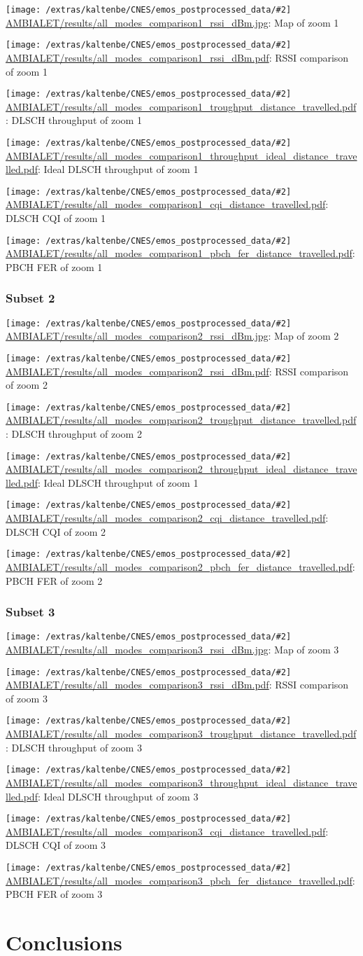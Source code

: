 \documentclass[a4paper,10pt]{article}
\newcommand{\printfile}[2][]{
 \begin{minipage}{8cm}
  \centering
  \texttt{[image: /extras/kaltenbe/CNES/emos\_postprocessed\_data/\#2]}
  \url{#2}: #1

 \end{minipage}
}
\begin{document}
\printfile[Map of zoom 1]{AMBIALET/results/all_modes_comparison1_rssi_dBm.jpg}
\printfile[RSSI comparison of zoom 1]{AMBIALET/results/all_modes_comparison1_rssi_dBm.pdf}

\printfile[DLSCH throughput of zoom 1]{AMBIALET/results/all_modes_comparison1_troughput_distance_travelled.pdf}
\printfile[Ideal DLSCH throughput of zoom 1]{AMBIALET/results/all_modes_comparison1_throughput_ideal_distance_travelled.pdf}

\printfile[DLSCH CQI of zoom 1]{AMBIALET/results/all_modes_comparison1_cqi_distance_travelled.pdf}
\printfile[PBCH FER of zoom 1]{AMBIALET/results/all_modes_comparison1_pbch_fer_distance_travelled.pdf}

\subsubsection*{Subset 2}

\printfile[Map of zoom 2]{AMBIALET/results/all_modes_comparison2_rssi_dBm.jpg}
\printfile[RSSI comparison of zoom 2]{AMBIALET/results/all_modes_comparison2_rssi_dBm.pdf}

\printfile[DLSCH throughput of zoom 2]{AMBIALET/results/all_modes_comparison2_troughput_distance_travelled.pdf}
\printfile[Ideal DLSCH throughput of zoom 1]{AMBIALET/results/all_modes_comparison2_throughput_ideal_distance_travelled.pdf}

\printfile[DLSCH CQI of zoom 2]{AMBIALET/results/all_modes_comparison2_cqi_distance_travelled.pdf}
\printfile[PBCH FER of zoom 2]{AMBIALET/results/all_modes_comparison2_pbch_fer_distance_travelled.pdf}

\subsubsection*{Subset 3}

\printfile[Map of zoom 3]{AMBIALET/results/all_modes_comparison3_rssi_dBm.jpg}
\printfile[RSSI comparison of zoom 3]{AMBIALET/results/all_modes_comparison3_rssi_dBm.pdf}

\printfile[DLSCH throughput of zoom 3]{AMBIALET/results/all_modes_comparison3_troughput_distance_travelled.pdf}
\printfile[Ideal DLSCH throughput of zoom 3]{AMBIALET/results/all_modes_comparison3_throughput_ideal_distance_travelled.pdf}

\printfile[DLSCH CQI of zoom 3]{AMBIALET/results/all_modes_comparison3_cqi_distance_travelled.pdf}
\printfile[PBCH FER of zoom 3]{AMBIALET/results/all_modes_comparison3_pbch_fer_distance_travelled.pdf}


\section{Conclusions}


 

\end{document}
